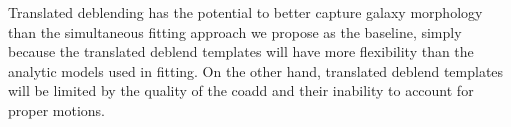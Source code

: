 \documentclass[10pt]{article}
\begin{document}
Translated deblending has the potential to better capture galaxy morphology
than the simultaneous fitting approach we propose as the baseline, simply
because the translated deblend templates will have more flexibility than the
analytic models used in fitting.  On the other hand, translated deblend
templates will be limited by the quality of the coadd and their inability to
account for proper motions.
\end{document}

